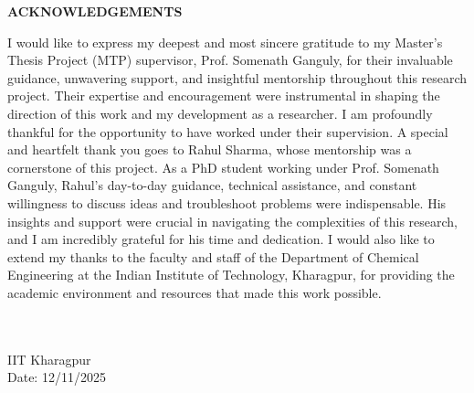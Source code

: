 \thispagestyle{plain}

\begin{center}
 \Large {\bf \uppercase{Acknowledgements}}
\end{center}

\vspace{3\baselineskip}

\noindent
I would like to express my deepest and most sincere gratitude to my Master's Thesis Project (MTP) supervisor, Prof. Somenath Ganguly, for their invaluable guidance, unwavering support, and insightful mentorship throughout this research project. Their expertise and encouragement were instrumental in shaping the direction of this work and my development as a researcher. I am profoundly thankful for the opportunity to have worked under their supervision. A special and heartfelt thank you goes to Rahul Sharma, whose mentorship was a cornerstone of this project. As a PhD student working under Prof. Somenath Ganguly, Rahul's day-to-day guidance, technical assistance, and constant willingness to discuss ideas and troubleshoot problems were indispensable. His insights and support were crucial in navigating the complexities of this research, and I am incredibly grateful for his time and dedication. I would also like to extend my thanks to the faculty and staff of the Department of Chemical Engineering at the Indian Institute of Technology, Kharagpur, for providing the academic environment and resources that made this work possible.


\noindent
\vspace{\baselineskip} \\
\textbf{\myname} \\
IIT Kharagpur \\
Date: 12/11/2025